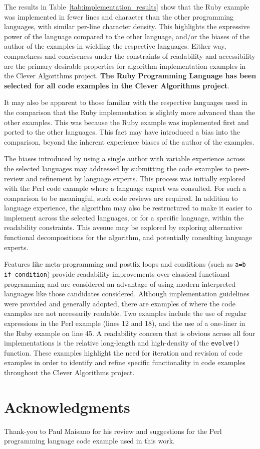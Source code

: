\documentclass[a4paper, 11pt]{article}
\begin{document}
The results in Table~\ref{tab:implementation_results} show that the Ruby example was implemented in fewer lines and character than the other programming languages, with similar per-line character density. This highlights the expressive power of the language compared to the other language, and/or the biases of the author of the examples in wielding the respective languages. Either way, compactness and conciseness under the constraints of readability and accessibility are the primary desirable properties for algorithm implementation examples in the Clever Algorithms project. \textbf{The Ruby Programming Language has been selected for all code examples in the Clever Algorithms project}. 

It may also be apparent to those familiar with the respective languages used in the comparison that the Ruby implementation is slightly more advanced than the other examples. This was because the Ruby example was implemented first and ported to the other languages. This fact may have introduced a bias into the comparison, beyond the inherent experience biases of the author of the examples.

The biases introduced by using a single author with variable experience across the selected languages may addressed by submitting the code examples to peer-review and refinement by language experts. This process was initially explored with the Perl code example where a language expert was consulted. For such a comparison to be meaningful, such code reviews are required.
In addition to language experience, the algorithm may also be restructured to make it easier to implement across the selected languages, or for a specific language, within the readability constraints. This avenue may be explored by exploring alternative functional decompositions for the algorithm, and potentially consulting language experts. 

Features like meta-programming and postfix loops and conditions (such as \texttt{a=b if condition}) provide readability improvements over classical functional programming and are considered an advantage of using modern interpreted languages like those candidates considered. 
Although implementation guidelines were provided and generally adopted, there are examples of where the code examples are not necessarily readable. Two examples include the use of regular expressions in the Perl example (lines 12 and 18), and the use of a one-liner in the Ruby example on line 45. A readability concern that is obvious across all four implementations is the relative long-length and high-density of the \texttt{evolve()} function.
These examples highlight the need for iteration and revision of code examples in order to identify and refine specific functionality in code examples throughout the Clever Algorithms project.

% 
% 
\section{Acknowledgments}
\label{sec:acknowledgments}
Thank-you to Paul Maisano for his review and suggestions for the Perl programming language code example used in this work.



\end{document}
